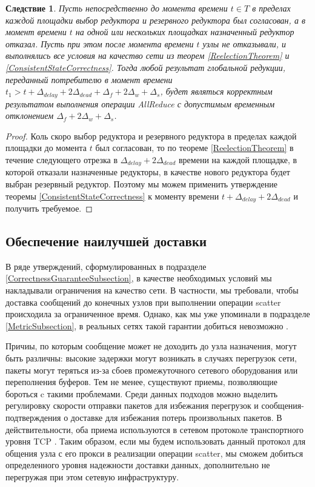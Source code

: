 \documentclass{article}
\theoremstyle{plain}
\theoremstyle{plain}
\newtheorem{consequence}[theorem]{Следствие}
\theoremstyle{plain}
\theoremstyle{plain}
\theoremstyle{definition}
\theoremstyle{remark}
\theoremstyle{plain}
\begin{document}
\begin{consequence}
    Пусть непосредственно до момента времени $t \in T$ в пределах каждой площадки выбор редуктора и резервного редуктора был согласован, а в момент времени $t$ на одной или нескольких площадках назначенный редуктор отказал. Пусть при этом после момента времени $t$ узлы не отказывали, и выполнялись все условия на качество сети из теорем \ref{ReelectionTheorem} и \ref{ConsistentStateCorrectness}. Тогда любой результат глобальной редукции, переданный потребителю в момент времени $t_1 > t + \Delta_{delay} + 2\Delta_{dead} + \Delta_f + 2\Delta_w + \Delta_s$, будет являться корректным результатом выполнения операции AllReduce с допустимым временным отклонением $\Delta_f + 2\Delta_w + \Delta_s$.
\end{consequence}
\begin{proof}
    Коль скоро выбор редуктора и резервного редуктора в пределах каждой площадки до момента $t$ был согласован, то по теореме \ref{ReelectionTheorem} в течение следующего отрезка в $\Delta_{delay} + 2\Delta_{dead}$ времени на каждой площадке, в которой отказали назначенные редукторы, в качестве нового редуктора будет выбран резервный редуктор. Поэтому мы можем применить утверждение теоремы \ref{ConsistentStateCorrectness} к моменту времени $t + \Delta_{delay} + 2\Delta_{dead}$ и получить требуемое.
\end{proof}

\subsection{Обеспечение наилучшей доставки}

В ряде утверждений, сформулированных в подразделе \ref{CorrectnessGuaranteeSubsection}, в качестве необходимых условий мы накладывали ограничения на качество сети. В частности, мы требовали, чтобы доставка сообщений до конечных узлов при выполнении операции scatter происходила за ограниченное время. Однако, как мы уже упоминали в подразделе \ref{MetricSubsection}, в реальных сетях такой гарантии добиться невозможно \cite{networking:best-effort-service}.

Причиы, по которым сообщение может не доходить до узла назначения, могут быть различны: высокие задержки могут возникать в случаях перегрузок сети, пакеты могут теряться из-за сбоев промежуточного сетевого оборудования или переполнения буферов. Тем не менее, существуют приемы, позволяющие бороться c такими проблемами. Среди данных подходов можно выделить регулировку скорости отправки пакетов для избежания перегрузок и сообщения-подтверждения о доставке для избежания потерь произвольных пакетов. В действительности, оба приема используются в сетевом протоколе транспортного уровня TCP \cite{RFC0793, RFC5681}. Таким образом, если мы будем использовать данный протокол для общения узла с его прокси в реализации операции scatter, мы сможем добиться определенного уровня надежности доставки данных, дополнительно не перегружая при этом сетевую инфраструктуру.
\end{document}
